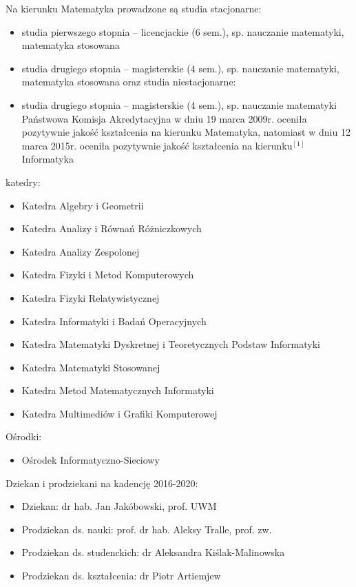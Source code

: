 \documentclass[a4paper,12pt]{article}
\begin{document}
Na kierunku Matematyka prowadzone są studia stacjonarne:
\begin{itemize}
\item studia pierwszego stopnia – licencjackie (6 sem.), sp. nauczanie matematyki, matematyka stosowana
\item studia drugiego stopnia – magisterskie (4 sem.), sp. nauczanie matematyki, matematyka stosowana
oraz studia niestacjonarne:
\item studia drugiego stopnia – magisterskie (4 sem.), sp. nauczanie matematyki
Państwowa Komisja Akredytacyjna w dniu 19 marca 2009r. oceniła pozytywnie jakość kształcenia na kierunku Matematyka, natomiast w dniu 12 marca 2015r. oceniła pozytywnie jakość kształcenia na kierunku$^{[1]}$
Informatyka 
\end{itemize}

katedry:
\begin{itemize}
\item Katedra Algebry i Geometrii
\item Katedra Analizy i Równań Różniczkowych
\item Katedra Analizy Zespolonej
\item Katedra Fizyki i Metod Komputerowych
\item Katedra Fizyki Relatywistycznej
\item Katedra Informatyki i Badań Operacyjnych
\item Katedra Matematyki Dyskretnej i Teoretycznych Podstaw Informatyki
\item Katedra Matematyki Stosowanej
\item Katedra Metod Matematycznych Informatyki
\item Katedra Multimediów i Grafiki Komputerowej
\end{itemize}
Ośrodki:
\begin{itemize}
\item Ośrodek Informatyczno-Sieciowy
\end{itemize}

Dziekan i prodziekani na kadencję 2016-2020:
\begin{itemize}
\item Dziekan: dr hab. Jan Jakóbowski, prof. UWM
\item Prodziekan ds. nauki: prof. dr hab. Aleksy Tralle, prof. zw.
\item Prodziekan ds. studenckich: dr Aleksandra Kiślak-Malinowska
\item Prodziekan ds. kształcenia: dr Piotr Artiemjew
\end{itemize}
\end{document}
